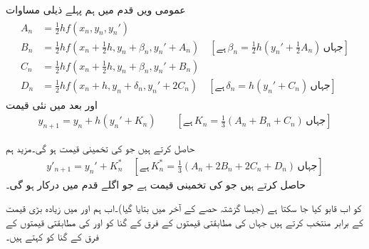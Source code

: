 عمومی  ویں قدم میں ہم پہلے ذیلی مساوات
\begin{gather}
\begin{aligned}\label{مساوات_اعدادی_رنج_کوٹا_نیستروم_الف}
A_n&=\tfrac{1}{2}h f(x_n,y_n,y_n')\\
B_n&=\tfrac{1}{2}hf(x_n+\tfrac{1}{2}h,y_n+\beta_n,y_n'+A_n)\quad [\text{ہے}\, \beta_n=\tfrac{1}{2}h(y_n'+\tfrac{1}{2}A_n)\,\text{جہاں}]\\
C_n&=\tfrac{1}{2}h f(x_n+\tfrac{1}{2}h,y_n+\beta_n,y_n'+B_n)\\
D_n&=\tfrac{1}{2}hf(x_n+h,y_n+\delta_n,y_n'+2C_n)\quad [\text{ہے}\, \delta_n=h(y_n'+C_n)\, \text{جہاں}]
\end{aligned}
\end{gather}
اور بعد میں نئی قیمت
\begin{align}\label{مساوات_اعدادی_رنج_کوٹا_نیستروم_ب}
y_{n+1}=y_n+h(y_n'+K_n)\quad \quad [\text{ہے}\, K_n=\tfrac{1}{3}(A_n+B_n+C_n)\,\text{جہاں}]
\end{align}

حاصل کرتے ہیں جو  کی تخمینی قیمت ہو گی۔مزید ہم
\begin{align}\label{مساوات_اعدادی_رنج_کوٹا_نیستروم_پ}
y'_{n+1}=y_n'+K_n^*\quad [\text{ہے}\, K_n^*=\tfrac{1}{3}(A_n+2B_n+2C_n+D_n)\,\text{جہاں}]
\end{align}
حاصل کرتے ہیں جو  کی تخمینی قیمت ہے جو اگلے قدم میں درکار ہو گی۔

 کو اب قابو کیا جا سکتا ہے (جیسا گزشتہ حصے کے آخر میں بتایا گیا)۔اب ہم  اور  میں زیادہ بڑی قیمت کے برابر منتخب کرتے ہیں جہاں  کی مطابقتی قیمتوں کے فرق کے  گنا کو  اور  کی مطابقتی قیمتوں کے فرق  کے  گنا کو  کہتے ہیں۔

